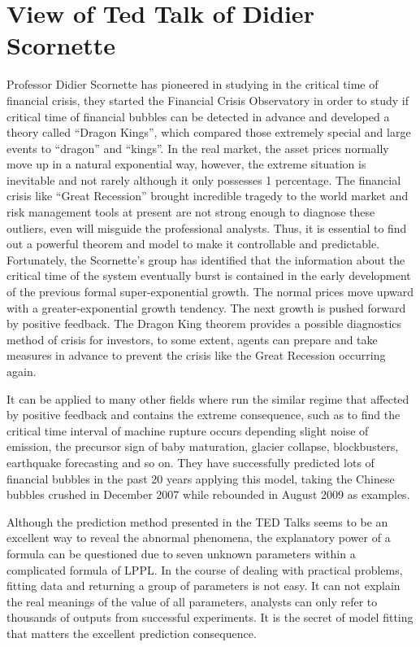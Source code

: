 \section{View of Ted Talk of Didier Scornette}
Professor Didier Scornette has pioneered in studying in the critical time of financial crisis, they started the Financial Crisis Observatory in order to study if critical time of financial bubbles can be detected in advance and developed a theory called ``Dragon Kings'', which compared those extremely special and large events to ``dragon'' and ``kings''. In the real market, the asset prices normally move up in a natural exponential way, however, the extreme situation is inevitable and not rarely although it only possesses 1 percentage. The financial crisis like ``Great Recession'' brought incredible tragedy to the world market and risk management tools at present are not strong enough to diagnose these outliers, even will misguide the professional analysts. Thus, it is essential to find out a powerful theorem and model to make it controllable and predictable.
Fortunately, the Scornette’s group has identified that the information about the critical time of the system eventually burst is contained in the early development of the previous formal super-exponential growth. The normal prices move upward with a greater-exponential growth tendency. The next growth is pushed forward by positive feedback. The Dragon King theorem provides a possible diagnostics method of crisis for investors, to some extent, agents can prepare and take measures in advance to prevent the crisis like the Great Recession occurring again.

It can be applied to many other fields where run the similar regime that affected by positive feedback and contains the extreme consequence, such as to find the critical time interval of machine rupture occurs depending slight noise of emission, the precursor sign of baby maturation, glacier collapse, blockbusters, earthquake forecasting and so on. They have successfully predicted lots of financial bubbles in the past 20 years applying this model, taking the Chinese bubbles crushed in December 2007 while rebounded in August 2009 as examples.

Although the prediction method presented in the TED Talks seems to be an excellent way to reveal the abnormal phenomena, the explanatory power of a formula can be questioned due to seven unknown parameters within a complicated formula of LPPL. In the course of dealing with practical problems, fitting data and returning a group of parameters is not easy. It can not explain the real meanings of the value of all parameters, analysts can only refer to thousands of outputs from successful experiments. It is the secret of model fitting that matters the excellent prediction consequence.
